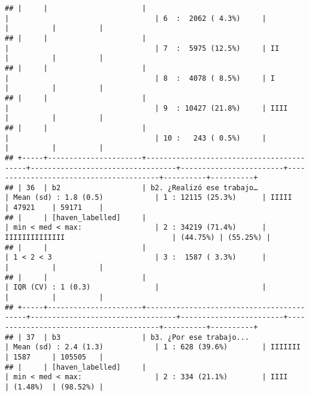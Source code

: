 \documentclass[]{article}
\begin{document}
\begin{verbatim}
## |     |                      |                                          |                                  | 6  :  2062 ( 4.3%)     |                                        |          |          |
## |     |                      |                                          |                                  | 7  :  5975 (12.5%)     | II                                     |          |          |
## |     |                      |                                          |                                  | 8  :  4078 ( 8.5%)     | I                                      |          |          |
## |     |                      |                                          |                                  | 9  : 10427 (21.8%)     | IIII                                   |          |          |
## |     |                      |                                          |                                  | 10 :   243 ( 0.5%)     |                                        |          |          |
## +-----+----------------------+------------------------------------------+----------------------------------+------------------------+----------------------------------------+----------+----------+
## | 36  | b2                   | b2. ¿Realizó ese trabajo…                | Mean (sd) : 1.8 (0.5)            | 1 : 12115 (25.3%)      | IIIII                                  | 47921    | 59171    |
## |     | [haven_labelled]     |                                          | min < med < max:                 | 2 : 34219 (71.4%)      | IIIIIIIIIIIIII                         | (44.75%) | (55.25%) |
## |     |                      |                                          | 1 < 2 < 3                        | 3 :  1587 ( 3.3%)      |                                        |          |          |
## |     |                      |                                          | IQR (CV) : 1 (0.3)               |                        |                                        |          |          |
## +-----+----------------------+------------------------------------------+----------------------------------+------------------------+----------------------------------------+----------+----------+
## | 37  | b3                   | b3. ¿Por ese trabajo...                  | Mean (sd) : 2.4 (1.3)            | 1 : 628 (39.6%)        | IIIIIII                                | 1587     | 105505   |
## |     | [haven_labelled]     |                                          | min < med < max:                 | 2 : 334 (21.1%)        | IIII                                   | (1.48%)  | (98.52%) |

\end{verbatim}
\end{document}
